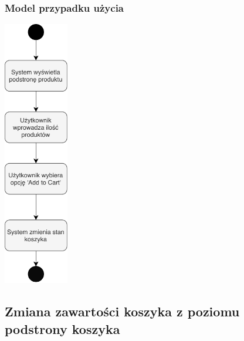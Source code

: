 \documentclass[10pt]{report}
\begin{document}
			\subsubsection{Model przypadku użycia}
				\begin{center}
					\includegraphics[width=80pt]{koszyk1.pdf}
				\end{center}
			
		\newpage
		\subsection{Zmiana zawartości koszyka z poziomu podstrony koszyka}
		
\end{document}
